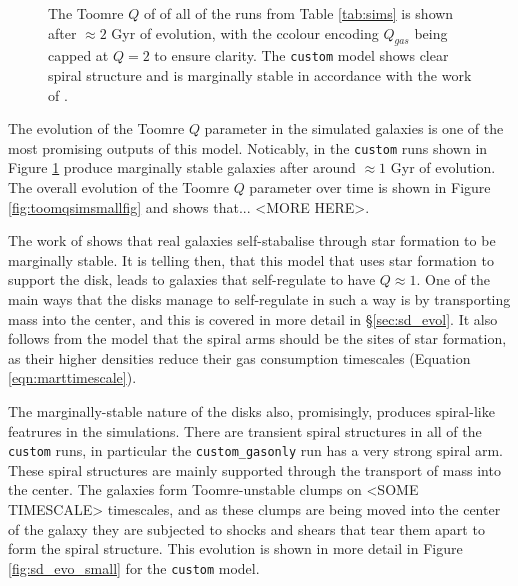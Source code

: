 \begin{figure}[!ht]
    \leavevmode\rlap{\usebox{\graphicsbox}}%
    \begin{minipage}[b]{0.63\wd\graphicsbox}%
        \caption{The Toomre $Q$ of of all of the runs from Table \ref{tab:sims} is shown after $\approx 2$ Gyr of evolution, with the ccolour encoding $Q_{gas}$ being capped at $Q=2$ to ensure clarity. The {\tt custom} model shows clear spiral structure and is marginally stable in accordance with the work of \citet{hopkins_stellar_2012}.}
        \label{fig:toomqsimbigfig}
    \end{minipage}\hspace*{0.33\wd\graphicsbox}%
\end{figure}

The evolution of the Toomre $Q$ parameter in the simulated galaxies is one of the most promising outputs of this model.
Noticably, in the {\tt custom} runs shown in Figure \ref{fig:toomqsimbigfig} produce marginally stable galaxies after around $\approx 1$ Gyr of evolution.
The overall evolution of the Toomre $Q$ parameter over time is shown in Figure \ref{fig:toomqsimsmallfig} and shows that... <MORE HERE>.

The work of \citet{hopkins_stellar_2012} shows that real galaxies self-stabalise through star formation to be marginally stable.
It is telling then, that this model that uses star formation to support the disk, leads to galaxies that self-regulate to have $Q\approx1$.
One of the main ways that the disks manage to self-regulate in such a way is by transporting mass into the center, and this is covered in more detail in \S \ref{sec:sd_evol}.
It also follows from the model that the spiral arms should be the sites of star formation, as their higher densities reduce their gas consumption timescales (Equation \ref{eqn:marttimescale}).

The marginally-stable nature of the disks also, promisingly, produces spiral-like featrures in the simulations.
There are transient spiral structures in all of the {\tt custom} runs, in particular the {\tt custom\_gasonly} run has a very strong spiral arm.
These spiral structures are mainly supported through the transport of mass into the center.
The galaxies form Toomre-unstable clumps on <SOME TIMESCALE> timescales, and as these clumps are being moved into the center of the galaxy they are subjected to shocks and shears that tear them apart to form the spiral structure.
This evolution is shown in more detail in Figure \ref{fig:sd_evo_small} for the {\tt custom} model.

